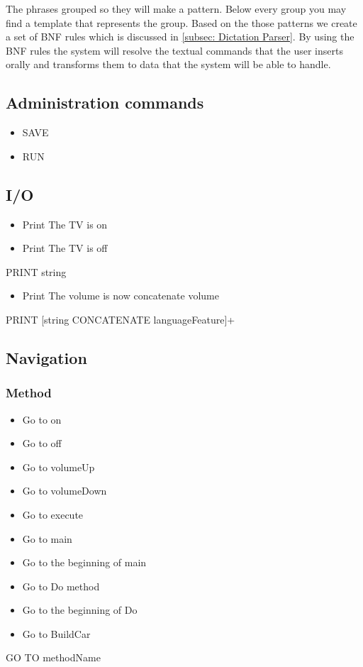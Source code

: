 The phrases grouped so they will make a pattern. Below every group you may find a template that represents the group. Based on the those patterns we create a set of BNF rules which is discussed in \ref{subsec: Dictation Parser}. By using the BNF rules the system will resolve the textual commands that the user inserts orally and transforms them to data that the system will be able to handle.
\subsection{Administration commands}
\begin{itemize}
	\item SAVE
	\item RUN
\end{itemize}
\subsection{I/O}
\begin{itemize}
	\item Print The TV is on
	\item Print The TV is off
\end{itemize}
PRINT string
\begin{itemize}
	\item Print The volume is now concatenate volume
\end{itemize}
PRINT [string CONCATENATE languageFeature]+
\subsection{Navigation}
\subsubsection{Method}
\begin{itemize}
	\item Go to on
	\item Go to off
	\item Go to volumeUp
	\item Go to volumeDown
	\item Go to execute
	\item Go to main
	\item Go to the beginning of main
	\item Go to Do method
	\item Go to the beginning of Do
	\item Go to BuildCar
\end{itemize}
GO TO methodName
